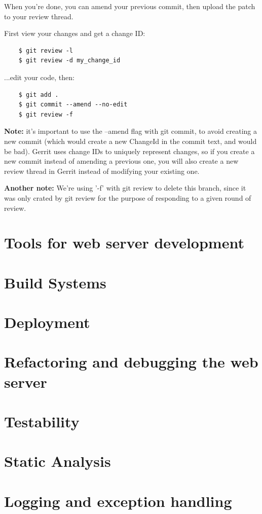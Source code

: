 \documentclass{article}
\begin{document}
When you're done, you can amend your previous commit, then upload the patch to your review thread. 

\vspace*{1em}

First view your changes and get a change ID:

\begin{verbatim}
    $ git review -l
    $ git review -d my_change_id
\end{verbatim}

...edit your code, then:

\begin{verbatim}
    $ git add .
    $ git commit --amend --no-edit
    $ git review -f 
\end{verbatim}

\textbf{Note: } it's important to use the --amend flag with git commit, to avoid creating a new commit (which would create a new ChangeId in the commit text, and would be bad). Gerrit uses change IDs to uniquely represent changes, so if you create a new commit instead of amending a previous one, you will also create a new review thread in Gerrit instead of modifying your existing one.

\textbf{Another note:} We're using '-f' with git review to delete this branch, since it was only crated by git review for the purpose of responding to a given round of review.

\pagebreak

\section{Tools for web server development}

\pagebreak

\section{Build Systems}

\pagebreak

\section{Deployment}

\pagebreak

\section{Refactoring and debugging the web server}

\pagebreak

\section{Testability}

\pagebreak

\section{Static Analysis}

\pagebreak

\section{Logging and exception handling}

\pagebreak
\end{document}
